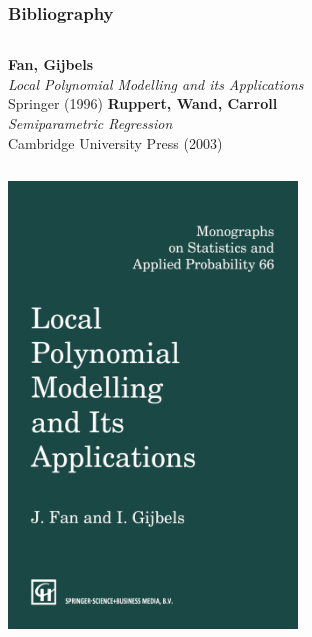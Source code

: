 \documentclass[pdf]{beamer}\usepackage[]{graphicx}\usepackage[]{color}
\begin{document}
\begin{frame}
\frametitle{Bibliography}

\begin{columns}
\small
\textbf{Fan, Gijbels} \\
\textit{Local Polynomial Modelling and its Applications} \\
Springer (1996)
\small
\textbf{Ruppert, Wand, Carroll} \\
\textit{Semiparametric Regression} \\
Cambridge University Press (2003)
\end{columns}

\begin{columns}
\begin{center}
\includegraphics[width=0.6\textwidth]{img/cover_localPolynomialModellingAndItsApplication.png}
\end{center}
\begin{center}

\end{center}
\end{columns}
\end{frame}
\end{document}
